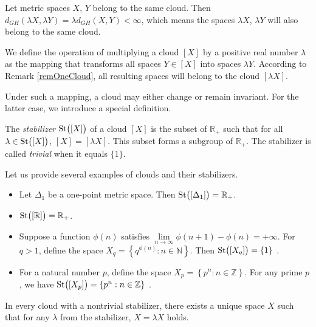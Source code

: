 \begin{remark}
  Let metric spaces $X$, $Y$ belong to the same cloud. Then
  $d_{GH}(\lambda X, \lambda Y) = \lambda d_{GH}(X,Y)\allowbreak <
  \infty$, which means the spaces $\lambda X$, $\lambda Y$ will also
  belong to the same cloud.
  \label{remOneCloud}
\end{remark}

\begin{definition}
  We define the operation of multiplying a cloud $[X]$ by a positive
  real number $\lambda$ as the mapping that transforms all spaces $Y
  \in [X]$ into spaces $\lambda Y$. According to Remark
  \ref{remOneCloud}, all resulting spaces will belong to the cloud
  $[\lambda X]$.
\end{definition}

Under such a mapping, a cloud may either change or remain invariant.
For the latter case, we introduce a special definition.

\begin{definition}
  The \emph{stabilizer} $\operatorname{St}\bigl([X]\bigr)$ of a cloud $[X]$ is the
  subset of $\mathbb{R}_+$ such that for all $\lambda \in
  \operatorname{St}\bigl([X]\bigr)$, $[X] = [\lambda X]$. This subset forms a
  subgroup of $\mathbb{R}_+$. The stabilizer is called \emph{trivial}
  when it equals $\{1\}$.
\end{definition}

Let us provide several examples of clouds and their stabilizers.

\begin{itemize}
  \item Let $\Delta_1$ be a one-point metric space. Then
    $\operatorname{St}\bigl([\Delta_1]\bigr) = \mathbb{R}_+$.
  \item $\operatorname{St}\bigl([\mathbb{R}]\bigr) = \mathbb{R}_+$.
  \item Suppose a function $\phi(n)$ satisfies $\lim\limits_{n
    \rightarrow \infty} \phi(n + 1) - \phi(n) = +\infty$. For $q >
    1$, define the space $X_q = \left\{q^{\phi(n)}: n \in
    \mathbb{N}\right\}$. Then $\operatorname{St}\bigl([X_q]\bigr) = \{1\}$
    \cite{TuzhBog1}.
  \item For a natural number $p$, define the space $X_p = \left\{p^n
    : n \in \mathbb{Z}\right\}$. For any prime $p$, we have
    $\operatorname{St}\bigl([X_p]\bigr) = \left\{p^n : n \in \mathbb{Z}\right\}$
    \cite{BogBog1}.
\end{itemize}

\begin{lemma}
  In every cloud with a nontrivial stabilizer, there exists a unique
  space $X$ such that for any $\lambda$ from the stabilizer, $X =
  \lambda X$ holds.
  \label{centerLemma}
\end{lemma}

